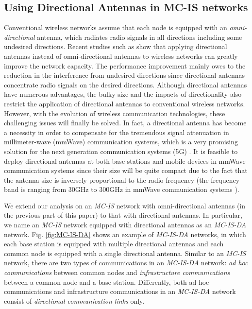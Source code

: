 \documentclass[10pt,journal]{IEEEtran}
\begin{document}
\subsection{Using Directional Antennas in MC-IS networks}
\label{subsec:dir}

Conventional wireless networks assume that each node is equipped with an \emph{omni-directional} antenna, which radiates radio signals in all directions including some undesired directions. Recent studies such as \cite{Su:2003,panli:capacity11} show that applying directional antennas instead of omni-directional antennas to wireless networks can greatly improve the network capacity. The performance improvement mainly owes to the reduction in the interference from undesired directions since directional antennas concentrate radio signals on the desired directions. Although directional antennas have numerous advantages, the bulky size and the impacts of directionality also restrict the application of directional antennas to conventional wireless networks. However, with the evolution of wireless communication technologies, these challenging issues will finally be solved. In fact, a directional antenna has become a necessity in order to compensate for the tremendous signal attenuation in millimeter-wave (mmWave) communication systems, which is a very promising solution for the next generation communication systems (5G) \cite{Rappaport:Access2013}. It is feasible to deploy directional antennas at both base stations and mobile devices in mmWave communication systems since their size will be quite compact due to the fact that the antenna size is inversely proportional to the radio frequency (the frequency band is ranging from 30GHz to 300GHz in mmWave communication systems \cite{JQiao:IEEECommMag15}).

We extend our analysis on an \emph{MC-IS} network with omni-directional antennas (in the previous part of this paper) to that with directional antennas. In particular, we name an \emph{MC-IS} network equipped with directional antennas as an \emph{MC-IS-DA} network. Fig. \ref{fig:MC-IS-DA} shows an example of \emph{MC-IS-DA} networks, in which each base station is equipped with multiple directional antennas and each common node is equipped with a single directional antenna. Similar to an \emph{MC-IS} network, there are two types of communications in an \emph{MC-IS-DA} network: {\it ad hoc communications} between common nodes and {\it infrastructure communications} between a common node and a base station. Differently, both ad hoc communications and infrastructure communications in an \emph{MC-IS-DA} network consist of \emph{directional communication links} only.
\end{document}
